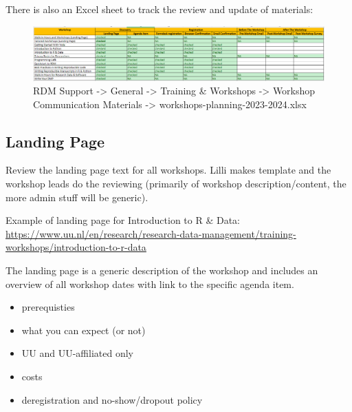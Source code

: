 \documentclass[
  letterpaper,
  DIV=11,
  numbers=noendperiod]{scrreprt}
\providecommand{\tightlist}{%
  \setlength{\itemsep}{0pt}\setlength{\parskip}{0pt}}\usepackage{longtable,booktabs,array}
\begin{document}
There is also an Excel sheet to track the review and update of
materials:
\href{https://solisservices.sharepoint.com/:x:/r/sites/RDMSpeeltuin/Shared\%20Documents/General/Trainings\%20and\%20Workshops/Workshop\%20Communication\%20Materials/workshops-planning-2023-2024.xlsx?d=w0037faec227d49c09d11be856d3c3cbb&csf=1&web=1&e=ggINu4&nav=MTVfezYzREREOTdELTNBNkMtNDJDOS1BRTQ2LTFDNzQ2MzBFMzZBRX0}{}

\begin{figure}[H]

{\centering \includegraphics{images/workshop-materials-checklist.PNG}

}

\caption{RDM Support -\textgreater{} General -\textgreater{} Training \&
Workshops -\textgreater{} Workshop Communication Materials
-\textgreater{} workshops-planning-2023-2024.xlsx}

\end{figure}%

\subsection*{Landing Page}\label{landing-page}

Review the landing page text for all workshops. Lilli makes template and
the workshop leads do the reviewing (primarily of workshop
description/content, the more admin stuff will be generic).

Example of landing page for Introduction to R \& Data:
\url{https://www.uu.nl/en/research/research-data-management/training-workshops/introduction-to-r-data}

The landing page is a generic description of the workshop and includes
an overview of all workshop dates with link to the specific agenda item.

\begin{itemize}
\tightlist
\item
  prerequisties
\item
  what you can expect (or not)
\item
  UU and UU-affiliated only
\item
  costs
\item
  deregistration and no-show/dropout policy
\end{itemize}
\end{document}
